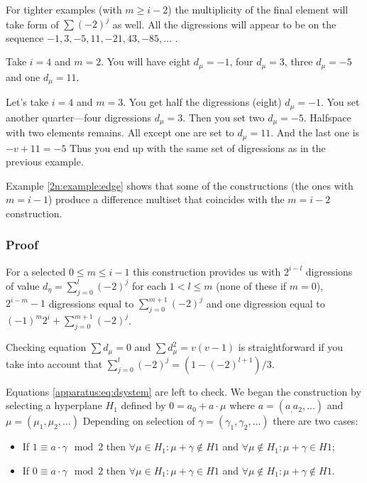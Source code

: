         For tighter examples (with $m\geq i-2$) the multiplicity of the final element will take form of $\sum (-2)^j$ as well. All the digressions will appear to be on the sequence $-1,3,-5,11,-21,43,-85,\ldots$ \cite{A077925}.
        
        \begin{example}
          Take $i=4$ and $m=2$. You will have eight $d_\mu=-1$, four $d_\mu=3$, three $d_\mu=-5$ and one $d_\mu=11$.
        \end{example}
        
        \begin{example}
            \label{2n:example:edge}
            Let's take $i=4$ and $m=3$. You get half the digressions (eight) $d_\mu=-1$. You set another quarter---four digressions $d_\mu=3$. Then you set two $d_\mu=-5$. Halfspace with two elements remains. All except one are set to $d_\mu=11$. And the last one is $-v+11=-5$ Thus you end up with the same set of digressions as in the previous example.
        \end{example}

        Example \ref{2n:example:edge} shows that some of the constructions (the ones with $m=i-1$) produce a difference multiset that coincides with the $m=i-2$ construction.
    
    \subsubsection{Proof}
        For a selected $0 \leq m \leq i-1$ this construction provides us with $2^{i-l}$ digressions of value $d_\eta=\sum\limits_{j=0}^l(-2)^j$ for each $1<l\leq m$ (none of these if $m=0$), $2^{i-m}-1$ digressions equal to $\sum\limits_{j=0}^{m+1}(-2)^j$ and one digression equal to $(-1)^m 2^i+\sum\limits_{j=0}^{m+1}(-2)^j$.
        
        Checking equation $\sum d_\mu = 0$ and $\sum d_\mu^2 = v(v-1)$ is straightforward if you take into account that $\sum\limits_{j=0}^l(-2)^j=(1-(-2)^{l+1})/3$.
        
        Equations \eqref{apparatus:eq:dsystem} are left to check. We began the construction by selecting a hyperplane $H_1$ defined by $0=a_0+a\cdot \mu$ where $a=(a_,a_2,\ldots)$ and $\mu=(\mu_1,\mu_2,\ldots)$ Depending on selection of $\gamma=(\gamma_1,\gamma_2,\ldots)$ there are two cases:
        \begin{itemize}
            \item If $1 \equiv a\cdot \gamma \mod 2$ then $\forall \mu \in H_1 : \mu+\gamma \notin H1 $ and $\forall \mu \notin H_1 : \mu+\gamma \in H1$;
            \item If $0 \equiv a\cdot \gamma \mod 2$ then $\forall \mu \in H_1 : \mu+\gamma \in H1 $ and $\forall \mu \notin H_1 : \mu+\gamma \notin H1$.
        \end{itemize}
        
